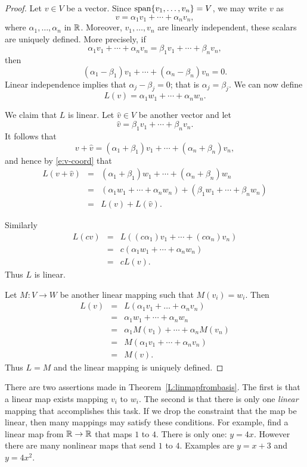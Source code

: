 \documentclass{ximera}
\begin{document}
\begin{proof} Let $v\in V$ be a vector.  Since ${\rm span}\{v_1,\ldots,v_n\}=V$, we may
write $v$ as
\[
v = \alpha_1v_1 + \cdots + \alpha_nv_n,
\]
where $\alpha_1,\ldots,\alpha_n$ in $\mbox{$\mathbb{R}$}$.   Moreover, $v_1,\ldots,v_n$
are linearly independent, these scalars are uniquely defined.  More
precisely, if
\[
\alpha_1v_1 + \cdots + \alpha_nv_n = \beta_1v_1 + \cdots + \beta_nv_n,
\]
then
\[
(\alpha_1-\beta_1)v_1 + \cdots + (\alpha_n-\beta_n)v_n = 0.
\]
Linear independence implies that $\alpha_j-\beta_j=0$; that is
$\alpha_j=\beta_j$.   We can now define
\begin{equation}  \label{e:v-coord}
L(v) = \alpha_1 w_1+\cdots+\alpha_n w_n.
\end{equation}

We claim that $L$ is linear.  Let $\hat{v}\in V$ be another
vector and let
\[
\hat{v} = \beta_1v_1+\cdots+\beta_nv_n.
\]
It follows that
\[
v+\hat{v} = (\alpha_1+\beta_1)v_1+\cdots+(\alpha_n+\beta_n)v_n,
\]
and hence by \eqref{e:v-coord} that
\begin{eqnarray*}
L(v+\hat{v}) & = &
(\alpha_1+\beta_1)w_1+\cdots+(\alpha_n+\beta_n)w_n\\
& = & (\alpha_1w_1+\cdots+\alpha_nw_n) +
(\beta_1w_1+\cdots+\beta_nw_n)  \\
& = & L(v) + L(\hat{v}).
\end{eqnarray*}

Similarly
\begin{eqnarray*}
L(cv) &  = & L( (c\alpha_1)v_1+\cdots +(c\alpha_n)v_n)\\
& = & c(\alpha_1w_1+\cdots+\alpha_nw_n)\\
& = & cL(v).
\end{eqnarray*}
Thus $L$ is linear.

Let $M:V\to W$ be another linear mapping such that $M(v_i)=w_i$.
Then
\begin{eqnarray*}
L(v) & = & L(\alpha_1v_1+\ldots +\alpha_nv_n)\\
& = & \alpha_1w_1+\cdots+\alpha_nw_n \\
& = & \alpha_1M(v_1) + \cdots +\alpha_nM(v_n)\\
& = & M(\alpha_1v_1 + \cdots +\alpha_nv_n)\\
& = & M(v).
\end{eqnarray*}
Thus $L=M$ and the linear mapping is uniquely defined.  \end{proof}


There are two assertions made in Theorem~\ref{L:linmapfrombasis}.
The first is that a linear map exists mapping $v_i$ to $w_i$.
The second is that there is only one {\em linear\/} mapping
that accomplishes this task.  If we drop the constraint that the
map be linear, then many mappings may satisfy these conditions.
For example, find a linear map from $\mbox{$\mathbb{R}$}\to\mbox{$\mathbb{R}$}$ that maps $1$ to $4$.
There is only one: $y=4x$.  However there are many nonlinear maps
that send $1$ to $4$.  Examples are $y=x+3$ and $y=4x^2$.
\end{document}
